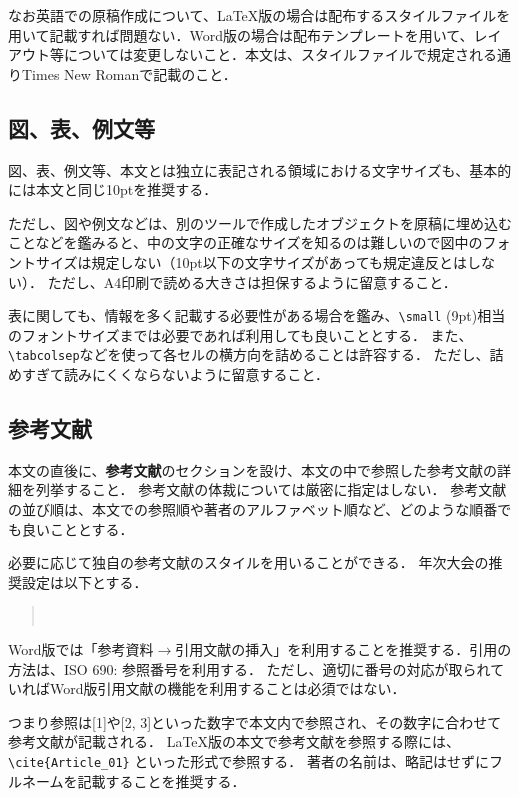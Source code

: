 \documentclass[
  platex, dvipdfmx,  %
]{nlp2021}
\begin{document}
なお英語での原稿作成について、LaTeX版の場合は配布するスタイルファイルを用いて記載すれば問題ない．Word版の場合は配布テンプレートを用いて、レイアウト等については変更しないこと．本文は、スタイルファイルで規定される通りTimes New Romanで記載のこと．



\subsection{図、表、例文等}
図、表、例文等、本文とは独立に表記される領域における文字サイズも、基本的には本文と同じ10ptを推奨する．

ただし、図や例文などは、別のツールで作成したオブジェクトを原稿に埋め込むことなどを鑑みると、中の文字の正確なサイズを知るのは難しいので図中のフォントサイズは規定しない（10pt以下の文字サイズがあっても規定違反とはしない）．
ただし、A4印刷で読める大きさは担保するように留意すること．

表に関しても、情報を多く記載する必要性がある場合を鑑み、\verb|\small| (9pt)相当のフォントサイズまでは必要であれば利用しても良いこととする．
また、\verb|\tabcolsep|などを使って各セルの横方向を詰めることは許容する．
ただし、詰めすぎて読みにくくならないように留意すること．





\subsection{参考文献}
本文の直後に、\textbf{参考文献}のセクションを設け、本文の中で参照した参考文献の詳細を列挙すること．
参考文献の体裁については厳密に指定はしない．
参考文献の並び順は、本文での参照順や著者のアルファベット順など、どのような順番でも良いこととする．

必要に応じて独自の参考文献のスタイルを用いることができる．
年次大会の推奨設定は以下とする．
\begin{quote}
\verb||\\
\verb||
\end{quote}
Word版では「参考資料$\xrightarrow{}$引用文献の挿入」を利用することを推奨する．引用の方法は、ISO 690: 参照番号を利用する．
ただし、適切に番号の対応が取られていればWord版引用文献の機能を利用することは必須ではない．

つまり参照は[1]や[2, 3]といった数字で本文内で参照され、その数字に合わせて参考文献が記載される．
LaTeX版の本文で参考文献を参照する際には、
\verb|\cite{Article_01}|
といった形式で参照する．
%
著者の名前は、略記はせずにフルネームを記載することを推奨する．
\end{document}
